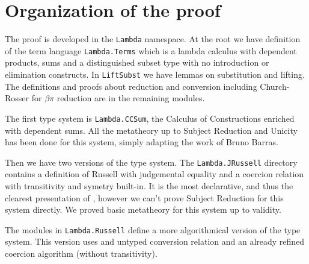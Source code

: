 \documentclass[11pt]{article}
\def\tactic#1{\texttt{#1}}
\def\coqmodule#1{\texttt{#1}}
\begin{document}

\section*{Organization of the \Coq proof}
The proof is developed in the \coqmodule{Lambda} namespace. At the root
we have definition of the term language \coqmodule{Lambda.Terms} which
is a lambda calculus with dependent products, sums and a distinguished
subset type with no introduction or elimination constructs. 
In \coqmodule{LiftSubst} we have lemmas on substitution and lifting.
The definitions and proofs about
reduction and conversion including Church-Rosser for $\beta\pi$ reduction
are in the remaining modules.

The first type system is \coqmodule{Lambda.CCSum}, the Calculus of
Constructions enriched with dependent sums. All the metatheory up to
Subject Reduction and Unicity has been done for this system, simply
adapting the work of Bruno Barras.

Then we have two versions of the \Russell type system.
The \coqmodule{Lambda.JRussell} directory contains a definition of
Russell with judgemental equality and a coercion relation with
transitivity and symetry built-in. It is the most declarative, and thus
the clearest presentation of \Russell, however we can't prove Subject
Reduction for this system directly. We proved basic metatheory for this
system up to validity.

The modules in \coqmodule{Lambda.Russell} define a more algorithmical
version of the \Russell type system. This version uses and untyped
conversion relation and an already refined coercion algorithm (without
transitivity).
\end{document}
